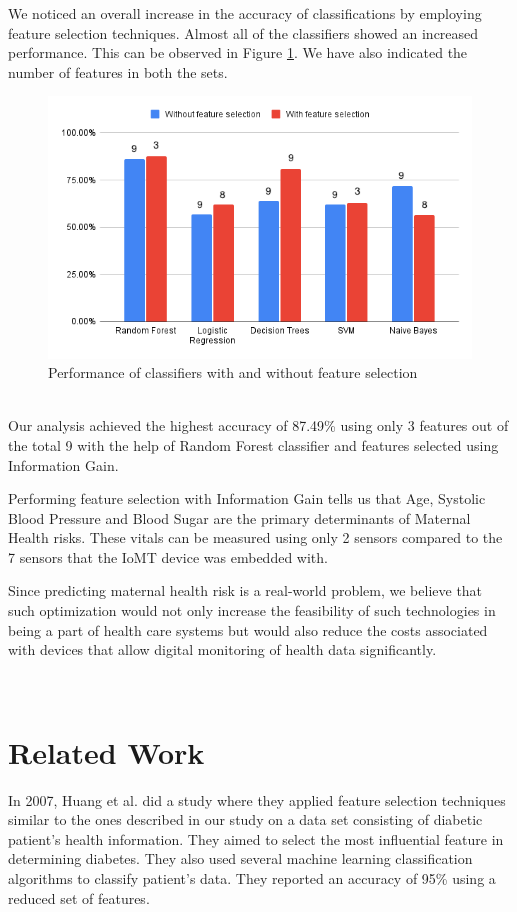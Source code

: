 \documentclass[conference]{IEEEtran}
\begin{document}
We noticed an overall increase in the accuracy of classifications by employing feature selection techniques. Almost all of the classifiers showed an increased performance. This can be observed in Figure \ref{fig:withvswithout}. We have also indicated the number of features in both the sets. 
\begin{figure}[!htp]
    \centering
    \includegraphics[width = \columnwidth]{chart(2).png}
    \caption{ Performance of classifiers with and without feature selection }
    \label{fig:withvswithout}
\end{figure}
\\
Our analysis achieved the highest accuracy of 87.49\% using only 3 features out of the total 9 with the help of Random Forest classifier and features selected using Information Gain. 

Performing feature selection with Information Gain tells us that Age, Systolic Blood Pressure and Blood Sugar are the primary determinants of Maternal Health risks. These vitals can be measured using only 2 sensors compared to the 7 sensors that the IoMT device was embedded with. 

Since predicting maternal health risk is a real-world problem, we believe that such optimization would not only increase the feasibility of such technologies in being a part of health care systems but would also reduce the costs associated with devices that allow digital monitoring of health data significantly.

\\
\section{Related Work}
In 2007, Huang et al. \cite{huang2007feature} did a study where they applied feature selection techniques similar to the ones described in our study on a data set consisting of diabetic patient's health information. They aimed to select the most influential feature in determining diabetes. They also used several machine learning classification algorithms to classify patient's data. They reported an accuracy of 95\% using a reduced set of features.
\end{document}

